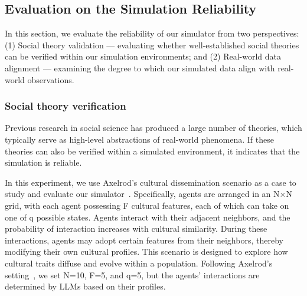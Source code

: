 \documentclass{article}
\theoremstyle{definition}
\theoremstyle{theorem}
\theoremstyle{proof}
\theoremstyle{remark}
\begin{document}
\begin{table}[t]
\centering
\caption{{Ablation study on different components of our scenario auto-construction subsystem}}
\renewcommand\arraystretch{1.1}
\label{tab:ablation}
\end{table}
    
    \subsection{Evaluation on the Simulation Reliability}
    In this section, we evaluate the reliability of our simulator from two perspectives: (1) Social theory validation — evaluating whether well-established social theories can be verified within our simulation environments; and (2) Real-world data alignment — examining the degree to which our simulated data align with real-world observations.
    
    
    \subsubsection{Social theory verification}\label{sec:emergence}
    Previous research in social science has produced a large number of theories, which typically serve as high-level abstractions of real-world phenomena. If these theories can also be verified within a simulated environment, it indicates that the simulation is reliable.

    In this experiment, we use Axelrod’s cultural dissemination scenario as a case to study and evaluate our simulator~\cite{axelrod1997dissemination}. Specifically, agents are arranged in an N×N grid, with each agent possessing F cultural features, each of which can take on one of q possible states. Agents interact with their adjacent neighbors, and the probability of interaction increases with cultural similarity. During these interactions, agents may adopt certain features from their neighbors, thereby modifying their own cultural profiles. This scenario is designed to explore how cultural traits diffuse and evolve within a population.
    Following Axelrod's setting~\cite{axelrod1997dissemination}, we set N=10, F=5, and q=5, but the agents' interactions are determined by LLMs based on their profiles.
\end{document}
